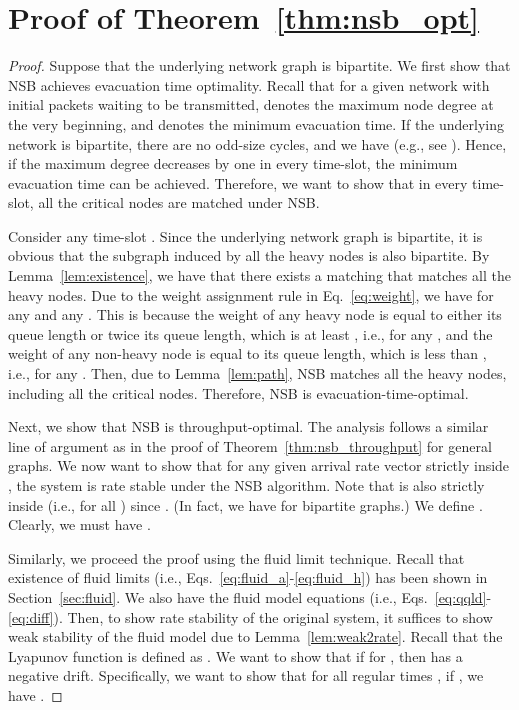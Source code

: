 \documentclass[10pt,journal,compsoc]{IEEEtran}
\begin{document}
\section{Proof of Theorem~\ref{thm:nsb_opt}} \label{sec:thm:nsb_opt}
\begin{proof}
Suppose that the underlying network graph is bipartite.
We first show that NSB achieves evacuation time optimality. Recall that for a given network 
with initial packets waiting to be transmitted,  denotes the maximum node degree at the 
very beginning, and  denotes the minimum evacuation time. If the underlying network is bipartite, 
there are no odd-size cycles, and we have  (e.g., see \cite{konig16,kapoor00,guptathesis}). 
Hence, if the maximum degree decreases by one in every time-slot, the minimum evacuation time can be achieved. 
Therefore, we want to show that in every time-slot, all the critical nodes are matched under NSB.


Consider any time-slot . Since the underlying network graph is bipartite, it is obvious that the subgraph
induced by all the heavy nodes is also bipartite. By Lemma~\ref{lem:existence}, we have that there exists 
a matching that matches all the heavy nodes. Due to the weight assignment rule in Eq.~\eqref{eq:weight},
we have  for any  and any . This is because
the weight of any heavy node is equal to either its queue length or twice its queue length, which is at least 
, i.e.,  for any , and the weight of 
any non-heavy node is equal to its queue length, which is less than , i.e., 
 for any . 
Then, due to Lemma~\ref{lem:path}, NSB matches all the heavy nodes, including all the critical nodes.
Therefore, NSB is evacuation-time-optimal.

Next, we show that NSB is throughput-optimal.
The analysis follows a similar line of argument as in the proof of Theorem~\ref{thm:nsb_throughput} 
for general graphs. We now want to show that for any given arrival rate vector  strictly inside 
, the system is rate stable under the NSB algorithm. Note that  is also strictly 
inside  (i.e.,  for all ) since .
(In fact, we have  for bipartite graphs.) 
We define . Clearly, we must have . 

Similarly, we proceed the proof using the fluid limit technique. 
Recall that existence of fluid limits (i.e., Eqs.~\eqref{eq:fluid_a}-\eqref{eq:fluid_h}) has been shown 
in Section~\ref{sec:fluid}. We also have the fluid model equations (i.e., Eqs.~\eqref{eq:qqld}-\eqref{eq:diff}).
Then, to show rate stability of the original system, it suffices to show weak stability of the fluid model 
due to Lemma~\ref{lem:weak2rate}. Recall that the Lyapunov function is defined as 
.
We want to show that if  for , then  has a negative drift. 
Specifically, we want to show that for all regular times , if , we have .


\end{proof}
\end{document}
